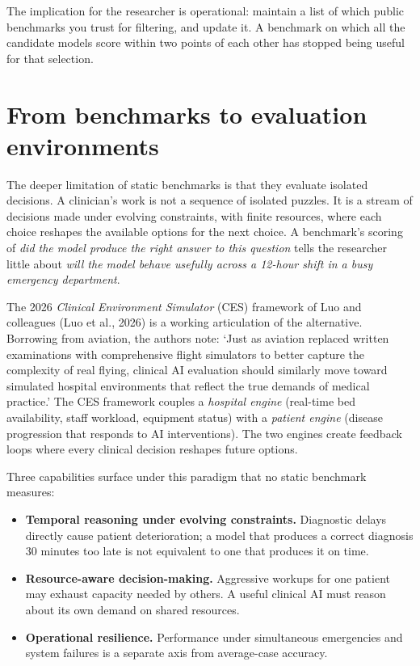 \documentclass[
  letterpaper,
  11pt]{scrbook}
\providecommand{\tightlist}{%
  \setlength{\itemsep}{0pt}\setlength{\parskip}{0pt}}
\begin{document}
The implication for the researcher is operational: maintain a list of
which public benchmarks you trust for filtering, and update it. A
benchmark on which all the candidate models score within two points of
each other has stopped being useful for that selection.

\section{From benchmarks to evaluation
environments}\label{from-benchmarks-to-evaluation-environments}

The deeper limitation of static benchmarks is that they evaluate
isolated decisions. A clinician's work is not a sequence of isolated
puzzles. It is a stream of decisions made under evolving constraints,
with finite resources, where each choice reshapes the available options
for the next choice. A benchmark's scoring of \emph{did the model
produce the right answer to this question} tells the researcher little
about \emph{will the model behave usefully across a 12-hour shift in a
busy emergency department}.

The 2026 \emph{Clinical Environment Simulator} (CES) framework of Luo
and colleagues ({Luo et al.}, 2026) is a working articulation of the
alternative. Borrowing from aviation, the authors note: `Just as
aviation replaced written examinations with comprehensive flight
simulators to better capture the complexity of real flying, clinical AI
evaluation should similarly move toward simulated hospital environments
that reflect the true demands of medical practice.' The CES framework
couples a \emph{hospital engine} (real-time bed availability, staff
workload, equipment status) with a \emph{patient engine} (disease
progression that responds to AI interventions). The two engines create
feedback loops where every clinical decision reshapes future options.

Three capabilities surface under this paradigm that no static benchmark
measures:

\begin{itemize}
\tightlist
\item
  \textbf{Temporal reasoning under evolving constraints.} Diagnostic
  delays directly cause patient deterioration; a model that produces a
  correct diagnosis 30 minutes too late is not equivalent to one that
  produces it on time.
\item
  \textbf{Resource-aware decision-making.} Aggressive workups for one
  patient may exhaust capacity needed by others. A useful clinical AI
  must reason about its own demand on shared resources.
\item
  \textbf{Operational resilience.} Performance under simultaneous
  emergencies and system failures is a separate axis from average-case
  accuracy.
\end{itemize}
\end{document}
